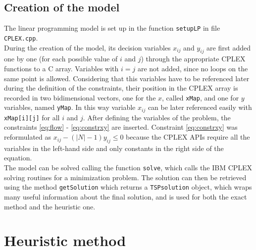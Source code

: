 \subsection{Creation of the model}
The linear programming model is set up in the function \texttt{setupLP} in file \texttt{CPLEX.cpp}.\\
During the creation of the model, its decision variables $x_{ij}$ and $y_{ij}$ are first added one by one (for each possible value of $i$ and $j$) through the appropriate CPLEX functions to a C array. Variables with $i = j$ are not added, since no loops on the same point is allowed. Considering that this variables have to be referenced later during the definition of the constraints, their position in the CPLEX array is recorded in two bidimensional vectors, one for the $x$, called \texttt{xMap}, and one for $y$ variables, named \texttt{yMap}. In this way variable $x_{ij}$ can be later referenced easily with \texttt{xMap[i][j]} for all $i$ and $j$. After defining the variables of the problem, the constraints \ref{eq:flow} - \ref{eq:constrxy} are inserted. Constraint \ref{eq:constrxy} was reformulated as $x_{ij} - (|N|-1)y_{ij} \le 0$ because the CPLEX APIs require all the variables in the left-hand side and only constants in the right side of the equation.\\
The model can be solved calling the function \texttt{solve}, which calls the IBM CPLEX solving routines for a minimization problem. The solution can then be retrieved using the method \texttt{getSolution} which returns a \texttt{TSPsolution} object, which wraps many useful information about the final solution, and is used for both the exact method and the heuristic one.

\section{Heuristic method}
\label{chap:heuris}

